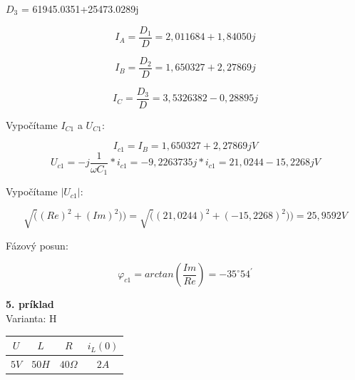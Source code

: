 \documentclass[a4paper,12pt]{article}
\begin{document}
\begin{center}
$D_3$ = 61945.0351+25473.0289j
\end{center}

\begin{equation*}
I_A = \frac{D_1}{D} = 2,011684 + 1,84050j
\end{equation*}

\begin{equation*}
I_B = \frac{D_2}{D} = 1,650327+2,27869j
\end{equation*}

\begin{equation*}
I_C = \frac{D_3}{D} = 3,5326382-0,28895j
\end{equation*}

\begin{flushleft}
Vypočítame $I_{C1}$ a $U_{C1}$:
\end{flushleft}

\begin{equation*}
    I_{c1} = I_B = 1,650327 + 2,27869j V    
\end{equation*}
\begin{equation*}
    U_{c1} = -j\frac{1}{\omega C_1}*i_{c1} = -9,2263735j * i_{c1} = 21,0244 - 15,2268j V
\end{equation*}

\begin{flushleft}
Vypočítame $|U_{c1}|$:
\end{flushleft}

\begin{equation*}
\surd((Re)^2 + (Im)^2)) = \surd((21,0244)^2 + (-15,2268)^2)) = 25,9592 V
\end{equation*}

\begin{flushleft}
Fázový posun: 
\end{flushleft}

\begin{equation*}
   \varphi_{c1} = arctan(\frac{Im}{Re}) = -35^{\circ}54^{\prime}
\end{equation*}



\newpage
\begin{flushleft}
\textbf{5. príklad}\\
Varianta: H
\end{flushleft}

\begin{tabular}{|c|c|c|c|}
\hline $U$ & $L$ & $R$ & $i_L(0)$ \\ 
\hline
$5V$ & $50H$ & $40\Omega$ & $2A$ \\ 
\hline
\end{tabular}
\bigskip
\end{document}
